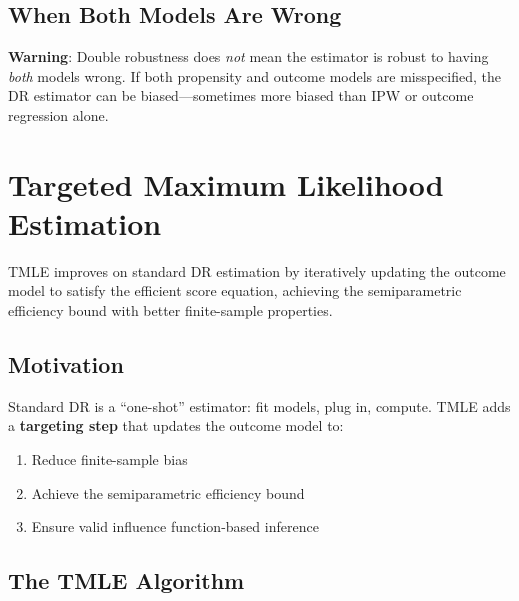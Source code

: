 \subsection{When Both Models Are Wrong}

\textbf{Warning}: Double robustness does \emph{not} mean the estimator is robust to having \emph{both} models wrong. If both propensity and outcome models are misspecified, the DR estimator can be biased---sometimes more biased than IPW or outcome regression alone.

\section{Targeted Maximum Likelihood Estimation}
\label{sec:tmle}

TMLE improves on standard DR estimation by iteratively updating the outcome model to satisfy the efficient score equation, achieving the semiparametric efficiency bound with better finite-sample properties.

\subsection{Motivation}

Standard DR is a ``one-shot'' estimator: fit models, plug in, compute. TMLE adds a \textbf{targeting step} that updates the outcome model to:
\begin{enumerate}
    \item Reduce finite-sample bias
    \item Achieve the semiparametric efficiency bound
    \item Ensure valid influence function-based inference
\end{enumerate}

\subsection{The TMLE Algorithm}

